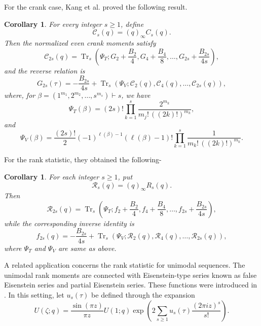 \documentclass[12pt,oneside,reqno]{amsart}
\numberwithin{equation}{section}
\newtheorem{coro}[theorem]{{\bf Corollary}}
\begin{document}
For the crank case, Kang et al.\cite{Kang2026} proved the following result.
\begin{coro}
	For every integer $s\geq1$, define
	\[
	\mathcal{C}_s(q)=(q)_\infty C_s(q).
	\]
	Then the normalized even crank moments satisfy
	\begin{equation}\label{eq1.28}
		\mathcal{C}_{2s}(q)
		=
		\operatorname{Tr}_s
		\left(
		\Psi_T;
		G_2+\frac{B_2}{4},
		G_4+\frac{B_4}{8},
		\dots,
		G_{2s}+\frac{B_{2s}}{4s}
		\right),
	\end{equation}
	and the reverse relation is
	\begin{equation}\label{eq1.29}
		G_{2s}(\tau)
		=
		-\frac{B_{2s}}{4s}
		+
		\operatorname{Tr}_s
		\left(
		\Psi_V;
		\mathcal{C}_2(q),
		\mathcal{C}_4(q),
		\dots,
		\mathcal{C}_{2s}(q)
		\right),
	\end{equation}
	where, for $\beta=(1^{m_1},2^{m_2},\ldots,s^{m_s})\vdash s$, we have 
	\begin{equation*} 
		\Psi_T(\beta) 
		= 
		(2s)! 
		\prod_{k=1}^{s} 
		\frac{2^{m_k}} 
		{m_j!\,((2k)!)^{m_k}}, 
	\end{equation*} 
	and 
	\begin{equation*} 
		\Psi_V(\beta) 
		= 
		\frac{(2s)!}{2} 
		(-1)^{\ell(\beta)-1} 
		(\ell(\beta)-1)! 
		\prod_{k=1}^{s} 
		\frac{1} 
		{m_k!\,((2k)!)^{m_k}}. 
	\end{equation*} 
\end{coro}

For the rank statistic, they obtained the following-
\begin{coro}
	For each integer $s\geq1$, put
	\[
	\mathcal{R}_s(q)=(q)_\infty R_s(q).
	\]
	Then
	\begin{equation}\label{eq1.30}
		\mathcal{R}_{2s}(q)
		=
		\operatorname{Tr}_s
		\left(
		\Psi_T;
		f_2+\frac{B_2}{4},
		f_4+\frac{B_4}{8},
		\dots,
		f_{2s}+\frac{B_{2s}}{4s}
		\right),
	\end{equation}
	while the corresponding inverse identity is
	\begin{equation}\label{eq1.31}
		f_{2s}(q)
		=
		-\frac{B_{2s}}{4s}
		+
		\operatorname{Tr}_s
		\left(
		\Psi_V;
		\mathcal{R}_2(q),
		\mathcal{R}_4(q),
		\dots,
		\mathcal{R}_{2s}(q)
		\right),
	\end{equation}
	 where $\Psi_T$ and $\Psi_V$ are same as above.
\end{coro}

A related application concerns the rank statistic for unimodal
sequences. The unimodal rank moments are connected with
Eisenstein-type series known as false Eisenstein series and
partial Eisenstein series. These functions were introduced in
\cite{Bringmann2026}. In this setting, let $u_s(\tau)$ be defined
through the expansion
\begin{equation}\label{eq1.32}
	U(\zeta;q)
	=
	\frac{\sin(\pi z)}{\pi z}U(1;q)
	\exp\left(
	2\sum_{s\geq1}
	u_s(\tau)\frac{(2\pi iz)^s}{s!}
	\right).
\end{equation}
\end{document}
